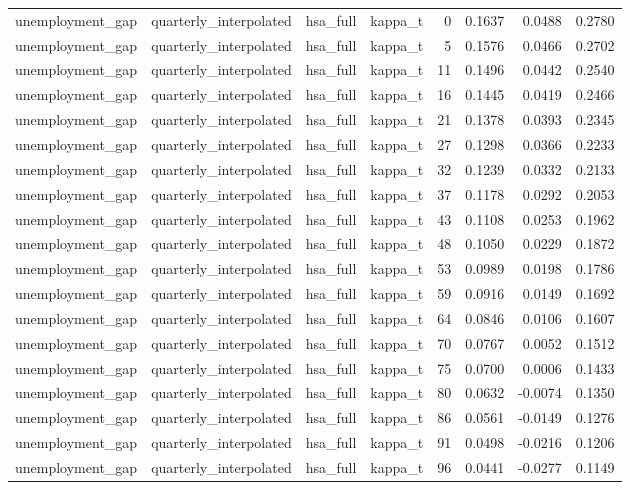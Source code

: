 \begin{tabular}{llllrrrr}
unemployment\_gap & quarterly\_interpolated & hsa\_full & kappa\_t & 0 & 0.1637 & 0.0488 & 0.2780 \\
unemployment\_gap & quarterly\_interpolated & hsa\_full & kappa\_t & 5 & 0.1576 & 0.0466 & 0.2702 \\
unemployment\_gap & quarterly\_interpolated & hsa\_full & kappa\_t & 11 & 0.1496 & 0.0442 & 0.2540 \\
unemployment\_gap & quarterly\_interpolated & hsa\_full & kappa\_t & 16 & 0.1445 & 0.0419 & 0.2466 \\
unemployment\_gap & quarterly\_interpolated & hsa\_full & kappa\_t & 21 & 0.1378 & 0.0393 & 0.2345 \\
unemployment\_gap & quarterly\_interpolated & hsa\_full & kappa\_t & 27 & 0.1298 & 0.0366 & 0.2233 \\
unemployment\_gap & quarterly\_interpolated & hsa\_full & kappa\_t & 32 & 0.1239 & 0.0332 & 0.2133 \\
unemployment\_gap & quarterly\_interpolated & hsa\_full & kappa\_t & 37 & 0.1178 & 0.0292 & 0.2053 \\
unemployment\_gap & quarterly\_interpolated & hsa\_full & kappa\_t & 43 & 0.1108 & 0.0253 & 0.1962 \\
unemployment\_gap & quarterly\_interpolated & hsa\_full & kappa\_t & 48 & 0.1050 & 0.0229 & 0.1872 \\
unemployment\_gap & quarterly\_interpolated & hsa\_full & kappa\_t & 53 & 0.0989 & 0.0198 & 0.1786 \\
unemployment\_gap & quarterly\_interpolated & hsa\_full & kappa\_t & 59 & 0.0916 & 0.0149 & 0.1692 \\
unemployment\_gap & quarterly\_interpolated & hsa\_full & kappa\_t & 64 & 0.0846 & 0.0106 & 0.1607 \\
unemployment\_gap & quarterly\_interpolated & hsa\_full & kappa\_t & 70 & 0.0767 & 0.0052 & 0.1512 \\
unemployment\_gap & quarterly\_interpolated & hsa\_full & kappa\_t & 75 & 0.0700 & 0.0006 & 0.1433 \\
unemployment\_gap & quarterly\_interpolated & hsa\_full & kappa\_t & 80 & 0.0632 & -0.0074 & 0.1350 \\
unemployment\_gap & quarterly\_interpolated & hsa\_full & kappa\_t & 86 & 0.0561 & -0.0149 & 0.1276 \\
unemployment\_gap & quarterly\_interpolated & hsa\_full & kappa\_t & 91 & 0.0498 & -0.0216 & 0.1206 \\
unemployment\_gap & quarterly\_interpolated & hsa\_full & kappa\_t & 96 & 0.0441 & -0.0277 & 0.1149 \\

\end{tabular}
